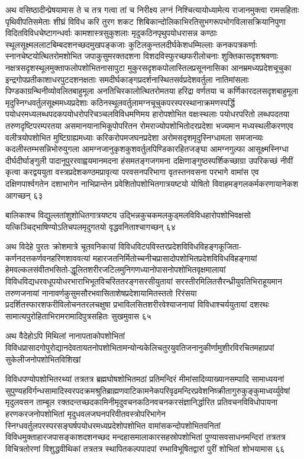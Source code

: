 अथ वसिष्ठादीन्प्रेषयामास ते च तत्र गत्वा तां च निरीक्ष्य लग्नं निश्चित्यायोध्यामेत्य
राजानमुक्त्वा रामसहिताः पृथिवीपतिसमेताः शीघ्रं विविध करि तुरग शकट
शिबिकान्दोलिकाभिरतिसुभगरूपभोगविलासक्रियानिपुणा विदितविविधचेष्टागन्धर्वाः
कामशास्त्रसुकुशलाः मृदुकठिनपृथुपयोधरासन्न कण्ठाः स्थूलसूक्ष्मललाटबिम्बदशनच्छदमुखपङ्कजाः
कुटिलकुन्तलदीर्घकेशधम्मिल्लाः कनकपत्रकर्णाः स्नानचेष्टयोत्थितरोमशोभित जपाकुसुमरक्तदशना
विशदविस्फुरच्छफरीलोचनाः शुक्तिकासदृशश्रवणाः नक्षत्रसदृशस्थूलमुक्ताफलोपशोभितनासापुटा
मुकुरसदृशकपोलास्तिलप्रसूननासिका आनम्रमध्यप्रदेशचूचुका इन्द्रगोपप्रतीकाशाधरपुटदशनक्षताः
समदीर्घकाङ्गप्रदर्शनास्थितसर्वप्रदेशवर्तुला नातिमांसलाः पिण्डकाग्रन्थिनीव्योवलितबाहुमूला
अनतिचिरकालोत्थितरोमतया हरिद्रा वर्णतया च कर्णिकारदलसदृशबाहुमूला
मृदुस्निग्धवर्तुलसूक्ष्ममध्यप्रदेशाः कठिनस्थूलवर्तुलामग्नचूचुकपरस्परस्थानाक्रमणस्पर्द्धि
पयोधरमध्यलब्धपदकपयोधरोपरिचञ्चलविविधमणिमय हारोपशोभित वक्षःस्थलाः पयोधरपरितो
लब्धपदतया तरुणदृष्टिपरम्परतया असमानयानाभिकूपोपरितन रोमराज्योपशोभितोदरप्रदेशा
भज्यमान मध्यस्थलीकरणएव वलीत्रयोपशोभित मुष्टिग्राह्यमध्याः करिकरोपमजघनप्रदेशा
अरोमसदृशमृदुस्निग्धामला समजान्व्यः कदलीस्तम्भसन्निभोरुयुगला
आमग्नजानुकृशकुशवर्तुलपिण्डिकारहितजङ्घा आमग्नगुल्फा आसूक्ष्मस्निग्धा दीर्घदीर्घाङ्गुली
पादानूपुररवाह्वयमानमदना हंसमतङ्गजगमना दक्षिणाङ्गुष्ठस्पर्शिकच्छाग्रा उपरिकच्छं नीवीं कृत्वा
करद्वययुता वस्त्रप्रदेशकण्ठमप्रावृत्या परवसनपरिभागा वृतस्तनवसना परभागे वामांस एव
दक्षिणपार्श्वगतेन दशाभागेन नाभिप्रान्तेन प्रवेशितोपशोभितगात्रयष्टयो योषितो
विवाहमङ्गलकर्मकरणायानेकश आगच्छन् ६३

बालिकाश्च विद्युल्लतांशुशोधितगात्रयष्टय उद्भिन्नकुचकमलकुड्मलविविधहारोपशोभिवक्षसो
यत्किञ्चिद्भाषिण्योऽतिचपलमृदुगतयो वृद्धवनिताश्चागच्छन् ६४

अथ विदेहे पुरतः क्रोशमात्रे चूतवनिकायां
विविधविटपविस्तरप्रदेशविविधविहङ्गकूजिता-कर्णनदत्तकर्णवनहरिणशाववत्यां
महारजतनिर्मितोच्चनीचप्रासादोपशोभितप्रदेशविविधविहङ्गायां
हेमवल्कलसंवीतभसितो-द्धूलितशरीरजटिलमुनिगणध्यानोपासनोपशोभितवृक्षमालायां
विविधविद्यधरवधूपयोधरभाराभिभूतविचरिततरङ्गसरसीयुतायां
सरस्तीरमिलितसैरन्ध्रीयुवतिभिराहूयमान तरुणजनायां
नानावर्णकुसुमसौरभवासिताशेषप्रदेशायामितस्ततो रिरंसया
प्रदर्शितस्फारशफरीविलोचनतरलचक्षुषा प्रभाविलसितशरीरवेश्याजनायां विविधाश्चर्ययुतायां
दशरथः सामात्यपुरोहिताभिरामरामादिपुत्रसहितः सुखमुवास ६५

अथ वैदेहोऽपि मिथिलां नानापताकोपशोभितां
विविधप्रासादगोपुरोद्यानदेवतायतनोपशोभितामन्योन्यकेलिचतुरयुवतिजनानुकीर्णामुशीरविरचितमहाप्रपां
सुकेलीजनोपशोभितविशिखां

विविधपण्योपशोभितरथ्यां तत्रतत्र ब्रह्मघोषशोभितमठां प्रतिमन्दिरं मीमांसादिव्याख्यानसम्पादि
सामाध्ययनां
सुपुण्यहविर्गन्धसामादिस्वरपदक्रमश्रुतिब्राह्मणवाटिकामनेकपरिवृढमन्दिरप्रवेशनिष्क्रीतागुरुकुङ्कुमाध्वर्य्युवेषां
मृदुलवसन ताम्बूल रक्तदन्तच्छदकामिनीमृदुवचनकठिनवचनकरसंज्ञानिर्द्धारित प्रतिवचनविविधोपायना
हरणकरजनोपशोभितां मृदुधवलजघनपरिवीतवस्त्रोपरिभागेन
स्निग्धवर्तुलपरस्परसङ्घर्षपयोधरमध्यप्रदेशोपशोभित वामांसकन्दोपशोभितवनितां
विविधमुक्ताहारजपासङ्काशदशनच्छद मन्दहासमालाकारसहस्रोपशोभितां पुण्यासवसाधनमन्दिरां
तत्रतत्र विचित्रतोरणां विशुद्धवीथिकां तत्रतत्र स्थापितकल्पपादपां रम्भाविभूषितद्वारां पुरीं
शोभितां शोभयामास ६६

